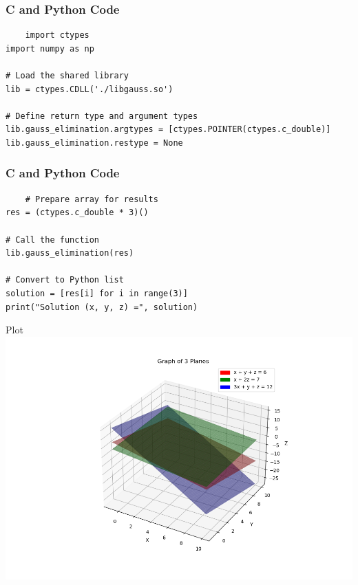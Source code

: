 \documentclass{beamer}
\begin{document}
\begin{frame}[fragile]
\frametitle{C and Python Code}
\begin{lstlisting}
    import ctypes
import numpy as np

# Load the shared library
lib = ctypes.CDLL('./libgauss.so')

# Define return type and argument types
lib.gauss_elimination.argtypes = [ctypes.POINTER(ctypes.c_double)]
lib.gauss_elimination.restype = None
\end{lstlisting}
\end{frame}
\begin{frame}[fragile]
\frametitle{C and Python Code}
\begin{lstlisting}
    # Prepare array for results
res = (ctypes.c_double * 3)()

# Call the function
lib.gauss_elimination(res)

# Convert to Python list
solution = [res[i] for i in range(3)]
print("Solution (x, y, z) =", solution)
\end{lstlisting}
\end{frame}
\begin{frame}{Plot}
    \centering
    \includegraphics[width=\columnwidth, height=0.8\textheight, keepaspectratio]{Figure_11.png}     
\end{frame}
\end{document}
